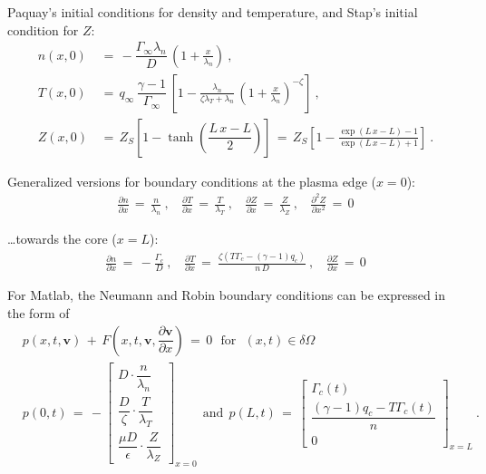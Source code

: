 \documentclass[a4paper,8pt]{article}
\begin{document}
Paquay's initial conditions for density and temperature, and Stap's
initial condition for \(Z\): \begin{align}
    n(x,0) \,&=\, -\dfrac{\Gamma_\infty \lambda_n}{D} \, \left(1 + \frac{x}{\lambda_n}\right)~, \\
    T(x,0) \,&=\, q_\infty \, \dfrac{\gamma - 1}{\Gamma_\infty} \, \left[1 - \frac{\lambda_n}{\zeta \lambda_T + \lambda_n} \, \left(1 + \frac{x}{\lambda_n}\right)^{-\zeta}\right]~, \\
    Z(x,0) \,&=\, Z_S\left[1 - \tanh\left(\dfrac{L\,x - L}{2}\right)\right] \,=\, Z_S\left[1 - \frac{\exp(L\,x - L) - 1}{\exp(L\,x - L) + 1}\right]~.
\end{align}

Generalized versions for boundary conditions at the plasma edge
(\(x=0\)): \begin{align}
    \frac{\partial n}{\partial x} \,=\, \frac{n}{\lambda_n}~, ~~~~\frac{\partial T}{\partial x} \,=\, \frac{T}{\lambda_T}~, ~~~~\frac{\partial Z}{\partial x} \,=\, \frac{Z}{\lambda_Z}~,~~~~ \frac{\partial^2 Z}{\partial x^2} \,=\, 0
\end{align}

\ldots{}towards the core (\(x=L\)): \begin{align}
    \frac{\partial n}{\partial x} \,=\, -\frac{\Gamma_c}{D}~, ~~~~ \frac{\partial T}{\partial x} \,=\ \frac{\zeta\left(T \Gamma_c - (\gamma - 1) q_c\right)}{n\,D}~, ~~~~\frac{\partial Z}{\partial x} \,=\, 0
\end{align}

For Matlab, the Neumann and Robin boundary conditions can be expressed
in the form of \small\begin{align}
    &p\left(x, t, \mathbf{v}\right) \,+\, F\left(x, t, \mathbf{v}, \dfrac{\partial\mathbf{v}}{\partial x}\right) \,=\, 0 ~~~ \text{for} ~~~ (x, t) \in \delta\Omega \\
&p(0, t) \,=\, -\begin{bmatrix}
                D \cdot \dfrac{n}{\lambda_n}\\[2ex]
                \dfrac{D}{\zeta} \cdot \dfrac{T}{\lambda_T} \\[2ex]
                \dfrac{\mu D}{\epsilon} \cdot \dfrac{Z}{\lambda_Z}
                \end{bmatrix}_{x = 0}
~~ \text{and} ~~
p(L, t) \,=\, \begin{bmatrix}
                \Gamma_c(t) \\[1ex]
                \dfrac{(\gamma - 1) q_c - T\Gamma_c(t)}{n} \\[2ex]
                0
                \end{bmatrix}_{x=L}~.
\end{align}\normalsize
\end{document}
